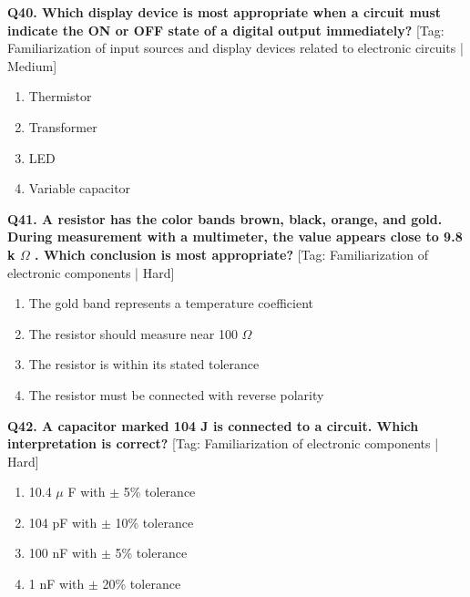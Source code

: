\noindent\textbf{Q40. Which display device is most appropriate when a circuit must indicate the ON or OFF state of a digital output immediately?} \hfill [Tag: Familiarization of input sources and display devices related to electronic circuits | Medium]
\begin{enumerate}[label=(\alph*),topsep=2pt,itemsep=1pt,partopsep=0pt,parsep=0pt]
    \item {Thermistor}
    \item {Transformer}
    \item {LED}
    \item {Variable capacitor}
\end{enumerate}
\vspace{2mm}

\noindent\textbf{Q41. A resistor has the color bands brown, black, orange, and gold. During measurement with a multimeter, the value appears close to 9.8 k $\Omega$ . Which conclusion is most appropriate?} \hfill [Tag: Familiarization of electronic components | Hard]
\begin{enumerate}[label=(\alph*),topsep=2pt,itemsep=1pt,partopsep=0pt,parsep=0pt]
    \item {The gold band represents a temperature coefficient}
    \item {The resistor should measure near 100 $\Omega$}
    \item {The resistor is within its stated tolerance}
    \item {The resistor must be connected with reverse polarity}
\end{enumerate}
\vspace{2mm}

\noindent\textbf{Q42. A capacitor marked 104 J is connected to a circuit. Which interpretation is correct?} \hfill [Tag: Familiarization of electronic components | Hard]
\begin{enumerate}[label=(\alph*),topsep=2pt,itemsep=1pt,partopsep=0pt,parsep=0pt]
    \item {10.4 $\mu$ F with $\pm$ 5\% tolerance}
    \item {104 pF with $\pm$ 10\% tolerance}
    \item {100 nF with $\pm$ 5\% tolerance}
    \item {1 nF with $\pm$ 20\% tolerance}
\end{enumerate}
\vspace{2mm}

